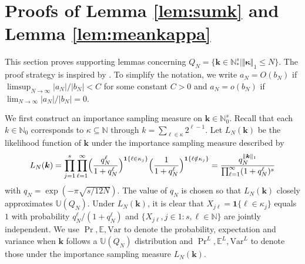 \documentclass{article}
\theoremstyle{definition}
\renewcommand{\leq}{\leqslant}
\newcommand{\natu}{\mathbb{N}}
\newcommand{\bsk}{\boldsymbol{k}}
\newcommand{\bsone}{\boldsymbol{1}}
\newcommand{\bskappa}{\boldsymbol{\kappa}}
\newcommand{\dunif}{\mathbb{U}}
\newcommand{\e}{\mathbb{E}}
\newcommand{\var}{\mathrm{Var}}
\begin{document}
\section{Proofs of Lemma \ref{lem:sumk} and Lemma \ref{lem:meankappa}}
This section proves supporting lemmas concerning $Q_N=\{\bsk\in \natu_*^s\mid \Vert\bskappa\Vert_1 \leq N\}$. The proof strategy is inspired by \cite{bert:1993}. To simplify the notation, we write $a_N=O(b_N)$ if $\limsup_{N\to\infty}|a_N|/|b_N|<C$ for some constant $C>0$ and  $a_N=o(b_N)$ if $\lim_{N\to\infty}|a_N|/|b_N|=0$. 

We first construct an importance sampling measure on $\bsk\in \natu_0^s$. Recall that each $k\in\natu_0$ corresponds to $\kappa\subseteq \natu$ through $k=\sum_{\ell\in \kappa}2^{\ell-1}$. Let $L_N(\bsk)$ be the likelihood function of $\bsk$ under the importance sampling measure described by
$$L_N(\bsk)=\prod_{j=1}^s \prod_{\ell=1}^\infty \Bigl(\frac{q_N^{\ell}}{1+q_N^\ell}\Bigr)^{\bsone\{\ell\in \kappa_j\}}\Bigl(\frac{1}{1+q_N^\ell}\Bigr)^{\bsone\{\ell\notin \kappa_j\}}=\frac{q_N^{\Vert\bsk\Vert_1}}{\prod_{\ell=1}^\infty (1+q_N^\ell)^s}$$
with $q_N=\exp(-\pi\sqrt{s/12N})$. The value of $q_N$ is chosen so that $L_N(\bsk)$ closely approximates $\dunif( Q_N)$. Under $L_N(\bsk)$, it is clear that $X_{j\ell}=\bsone\{\ell\in \kappa_j\}$ equals $1$ with probability $q_N^\ell/(1+q_N^\ell)$ and $\{X_{j\ell},j\in 1{:}s, \ell\in \natu\}$ are jointly independent. We use ${\textstyle\Pr},\e, \var$ to denote the probability, expectation and variance when $\bsk$ follows a $\dunif( Q_N)$ distribution and ${\textstyle\Pr}^L,\e^L, \var^L$ to denote those under the importance sampling measure $L_N(\bsk)$.
\end{document}
